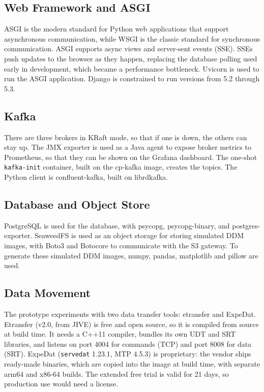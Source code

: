 \documentclass[12pt]{article}
\begin{document}
\subsection*{Web Framework and ASGI}

  ASGI is the modern standard for Python web applications that support asynchronous communication, while WSGI is the classic standard for synchronous communication. ASGI supports async views and server-sent events (SSE). SSEs push updates to the browser as they happen, replacing the database polling used early in development, which became a performance bottleneck. Uvicorn is used to run the ASGI application. Django is constrained to run versions from 5.2 through 5.3.

\subsection*{Kafka}

  There are three brokers in KRaft mode, so that if one is down, the others can stay up. The JMX exporter is used as a Java agent to expose broker metrics to Prometheus, so that they can be shown on the Grafana dashboard. The one-shot \texttt{kafka-init} container, built on the cp-kafka image, creates the topics. The Python client is confluent-kafka, built on librdkafka.

\subsection*{Database and Object Store}

  PostgreSQL is used for the database, with psycopg, psycopg-binary, and postgres-exporter. SeaweedFS is used as an object storage for storing simulated DDM images, with Boto3 and Botocore to communicate with the S3 gateway. To generate these simulated DDM images, numpy, pandas, matplotlib and pillow are used.

\subsection*{Data Movement}

  The prototype experiments with two data transfer tools: etransfer and ExpeDat. Etransfer (v2.0, from JIVE) is free and open source, so it is compiled from source at build time. It needs a C++11 compiler, bundles its own UDT and SRT libraries, and listens on port 4004 for commands (TCP) and port 8008 for data (SRT). ExpeDat (\texttt{servedat} 1.23.1, MTP 4.5.3) is proprietary: the vendor ships ready-made binaries, which are copied into the image at build time, with separate arm64 and x86-64 builds. The extended free trial is valid for 21 days, so production use would need a license.
\end{document}
